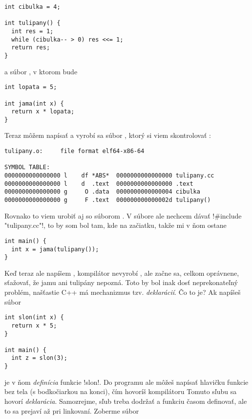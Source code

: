 \begin{lstlisting}
int cibulka = 4;

int tulipany() {
  int res = 1;
  while (cibulka-- > 0) res <<= 1;
  return res;
}
\end{lstlisting}

a súbor , v ktorom bude

\begin{lstlisting}
int lopata = 5;

int jama(int x) {
  return x * lopata;
}
\end{lstlisting}

Teraz môžem napísať  a vyrobí sa súbor , ktorý si viem skontrolovať
 :

\begin{Verbatim}[frame=single]
tulipany.o:     file format elf64-x86-64

SYMBOL TABLE:
0000000000000000 l    df *ABS*	0000000000000000 tulipany.cc
0000000000000000 l    d  .text	0000000000000000 .text
0000000000000000 g     O .data	0000000000000004 cibulka
0000000000000000 g     F .text	000000000000002d tulipany()
\end{Verbatim}

Rovnako to viem urobiť aj so súborom . V súbore  ale nechcem dávať \prg!#include "tulipany.cc"!, 
to by som bol tam, kde na začiatku, takže mi v ňom ostane

\begin{lstlisting}
int main() { 
  int x = jama(tulipany()); 
}
\end{lstlisting}

Keď teraz ale napíšem , kompilátor nevyrobí , ale začne sa, celkom oprávnene, sťažovať, že jamu ani tulipány nepozná. Toto by bol inak dosť neprekonateľný problém, našťastie C++ má mechanizmus 
tzv. {\em deklarácií}. Čo to je? Ak napíšeš súbor 

\begin{lstlisting} 
int slon(int x) {
  return x * 5;
}

int main() {
  int z = slon(3);
}
\end{lstlisting}

je v ňom {\em definícia} funkcie \prg!slon!. Do programu ale môžeš napísať hlavičku funkcie bez tela 
(s bodkočiarkou na konci), čím hovoríš kompilátoru
Tomuto sľubu sa hovorí {\em deklarácia}.
Samozrejme,
sľub treba dodržať a funkciu časom definovať, ale to sa prejaví až pri linkovaní. Zoberme súbor

